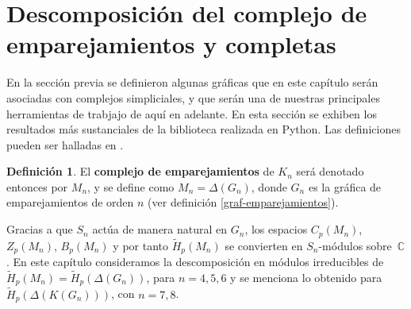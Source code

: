 \documentclass[12pt]{book}
\theoremstyle{definition}
\newtheorem{definition}[theorem]{Definición}
\newcounter{in}
\newcounter{ini}
\begin{document}
\section[Descomposición]{Descomposición del complejo de emparejamientos y completas}
\label{hom_ce_cc}
En la sección previa se definieron algunas gráficas que en este capítulo serán asociadas con complejos simpliciales, y que serán una de nuestras principales herramientas de trabjajo de aquí en adelante. En esta sección se exhiben los resultados más sustanciales de la biblioteca realizada en Python. Las definiciones pueden ser halladas en \cite{larrion2008equivariant}.


\begin{definition}
El \textbf{complejo de emparejamientos} de $K_{n}$ será denotado
entonces por $M_{n}$, y se define como $M_{n}=\Delta(G_{n})$, donde $G_{n}$ es la gráfica de
emparejamientos de orden $n$ (ver definición \ref{graf-emparejamientos}).
\end{definition}
 


Gracias a que $S_{n}$ actúa de manera
natural en $G_{n}$, los espacios $C_{p}(M_{n})$, $Z_{p}(M_{n})$,
$B_{p}(M_{n})$ y por tanto $\widetilde H_{p}(M_{n})$ se convierten en
$S_{n}$-módulos sobre~$\mathbb{C}$. En este capítulo consideramos
la descomposición en módulos irreducibles de
$\widetilde H_{p}(M_{n})=\widetilde H_{p}(\Delta(G_{n}))$, para
$n=4,5,6$ y se menciona lo obtenido para $\widetilde H_{p}(\Delta(K(G_{n})))$, con $n=7,8$.
\end{document}
